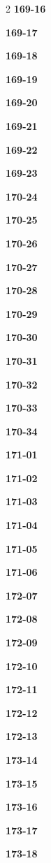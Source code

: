 \documentclass[10pt,a4paper]{article}
\begin{document}
\begin{multicols}{2}
\noindent\textbf{169-16}\ \par
\noindent\textbf{169-17}\ \par
\noindent\textbf{169-18}\ \par
\noindent\textbf{169-19}\ \par
\noindent\textbf{169-20}\ \par
\noindent\textbf{169-21}\ \par
\noindent\textbf{169-22}\ \par
\noindent\textbf{169-23}\ \par
\noindent\textbf{170-24}\ \par
\noindent\textbf{170-25}\ \par
\noindent\textbf{170-26}\ \par
\noindent\textbf{170-27}\ \par
\noindent\textbf{170-28}\ \par
\noindent\textbf{170-29}\ \par
\noindent\textbf{170-30}\ \par
\noindent\textbf{170-31}\ \par
\noindent\textbf{170-32}\ \par
\noindent\textbf{170-33}\ \par
\noindent\textbf{170-34}\ \par
\noindent\textbf{171-01}\ \par
\noindent\textbf{171-02}\ \par
\noindent\textbf{171-03}\ \par
\noindent\textbf{171-04}\ \par
\noindent\textbf{171-05}\ \par
\noindent\textbf{171-06}\ \par
\noindent\textbf{172-07}\ \par
\noindent\textbf{172-08}\ \par
\noindent\textbf{172-09}\ \par
\noindent\textbf{172-10}\ \par
\noindent\textbf{172-11}\ \par
\noindent\textbf{172-12}\ \par
\noindent\textbf{172-13}\ \par
\noindent\textbf{173-14}\ \par
\noindent\textbf{173-15}\ \par
\noindent\textbf{173-16}\ \par
\noindent\textbf{173-17}\ \par
\noindent\textbf{173-18}\ \par

\end{multicols}
\end{document}
